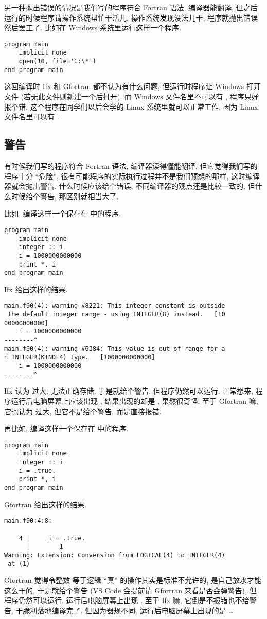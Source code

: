 另一种抛出错误的情况是我们写的程序符合 Fortran 语法, 编译器能翻译, 但之后运行的时候程序请操作系统帮忙干活儿, 操作系统发现没法儿干, 程序就抛出错误然后罢工了. 比如在 Windows 系统里运行这样一个程序.
\begin{lstlisting}
program main
    implicit none
    open(10, file='C:\*')
end program main
\end{lstlisting}
这回编译时 Ifx 和 Gfortran 都不认为有什么问题, 但运行时程序让 Windows 打开文件  (若无此文件则新建一个后打开), 而 Windows 文件名里不可以有 \ttt{*}, 程序只好报个错. 这个程序在同学们以后会学的 Linux 系统里就可以正常工作, 因为 Linux 文件名里可以有 \ttt{*}.

\subsection{警告}\label{fortran_warning}

有时候我们写的程序符合 Fortran 语法, 编译器读得懂能翻译, 但它觉得我们写的程序十分 ``危险'', 很有可能程序的实际执行过程并不是我们预想的那样, 这时编译器就会抛出警告. 什么时候应该给个错误, 不同编译器的观点还是比较一致的, 但什么时候给个警告, 那区别就相当大了.

比如, 编译这样一个保存在  中的程序.
\begin{lstlisting}
program main
    implicit none
    integer :: i
    i = 1000000000000
    print *, i
end program main
\end{lstlisting}
Ifx 给出这样的结果.
\begin{verbatim}
main.f90(4): warning #8221: This integer constant is outside
 the default integer range - using INTEGER(8) instead.   [10
00000000000]
    i = 1000000000000
--------^
main.f90(4): warning #6384: This value is out-of-range for a
n INTEGER(KIND=4) type.   [1000000000000]
    i = 1000000000000
--------^
\end{verbatim}
Ifx 认为  过大, 无法正确存储, 于是就给个警告, 但程序仍然可以运行. 正常想来, 程序运行后电脑屏幕上应该出现 , 结果出现的却是 , 果然很奇怪! 至于 Gfortran 嘛, 它也认为 过大, 但它不是给个警告, 而是直接报错.

再比如, 编译这样一个保存在  中的程序.
\begin{lstlisting}
program main
    implicit none
    integer :: i
    i = .true.
    print *, i
end program main
\end{lstlisting}
Gfortran 给出这样的结果.
\begin{verbatim}
main.f90:4:8:

    4 |     i = .true.
      |        1
Warning: Extension: Conversion from LOGICAL(4) to INTEGER(4)
 at (1)
\end{verbatim}
Gfortran 觉得令整数  等于逻辑 ``真'' 的操作其实是标准不允许的, 是自己放水才能这么干的, 于是就给个警告 (VS Code 会提前请 Gfortran 来看是否会弹警告), 但程序仍然可以运行. 运行后电脑屏幕上出现  . 至于 Ifx 嘛, 它倒是不报错也不给警告, 干脆利落地编译完了, 但因为器规不同, 运行后电脑屏幕上出现的是 \dots{}


